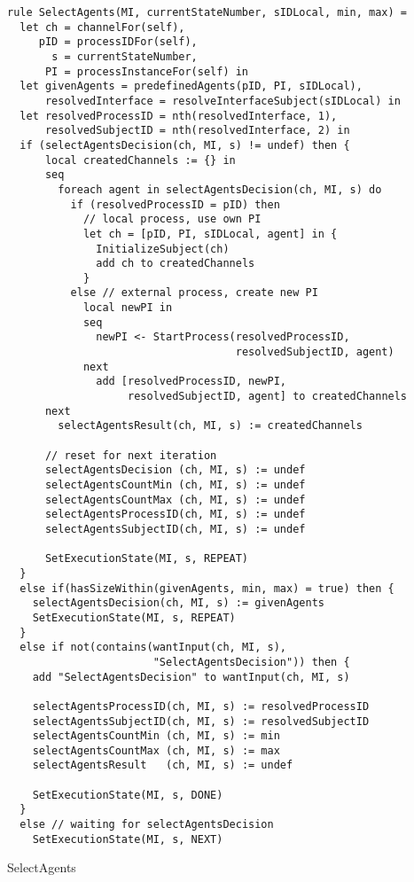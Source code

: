 \begin{listing}[H]
\begin{verbatim}
rule SelectAgents(MI, currentStateNumber, sIDLocal, min, max) =
  let ch = channelFor(self),
     pID = processIDFor(self),
       s = currentStateNumber,
      PI = processInstanceFor(self) in
  let givenAgents = predefinedAgents(pID, PI, sIDLocal),
      resolvedInterface = resolveInterfaceSubject(sIDLocal) in
  let resolvedProcessID = nth(resolvedInterface, 1),
      resolvedSubjectID = nth(resolvedInterface, 2) in
  if (selectAgentsDecision(ch, MI, s) != undef) then {
      local createdChannels := {} in
      seq
        foreach agent in selectAgentsDecision(ch, MI, s) do
          if (resolvedProcessID = pID) then
            // local process, use own PI
            let ch = [pID, PI, sIDLocal, agent] in {
              InitializeSubject(ch)
              add ch to createdChannels
            }
          else // external process, create new PI
            local newPI in
            seq
              newPI <- StartProcess(resolvedProcessID,
                                    resolvedSubjectID, agent)
            next
              add [resolvedProcessID, newPI,
                   resolvedSubjectID, agent] to createdChannels
      next
        selectAgentsResult(ch, MI, s) := createdChannels

      // reset for next iteration
      selectAgentsDecision (ch, MI, s) := undef
      selectAgentsCountMin (ch, MI, s) := undef
      selectAgentsCountMax (ch, MI, s) := undef
      selectAgentsProcessID(ch, MI, s) := undef
      selectAgentsSubjectID(ch, MI, s) := undef

      SetExecutionState(MI, s, REPEAT)
  }
  else if(hasSizeWithin(givenAgents, min, max) = true) then {
    selectAgentsDecision(ch, MI, s) := givenAgents
    SetExecutionState(MI, s, REPEAT)
  }
  else if not(contains(wantInput(ch, MI, s),
                       "SelectAgentsDecision")) then {
    add "SelectAgentsDecision" to wantInput(ch, MI, s)

    selectAgentsProcessID(ch, MI, s) := resolvedProcessID
    selectAgentsSubjectID(ch, MI, s) := resolvedSubjectID
    selectAgentsCountMin (ch, MI, s) := min
    selectAgentsCountMax (ch, MI, s) := max
    selectAgentsResult   (ch, MI, s) := undef

    SetExecutionState(MI, s, DONE)
  }
  else // waiting for selectAgentsDecision
    SetExecutionState(MI, s, NEXT)
\end{verbatim}
\caption{SelectAgents}
\label{lst:asm:SelectAgents}
\end{listing}
